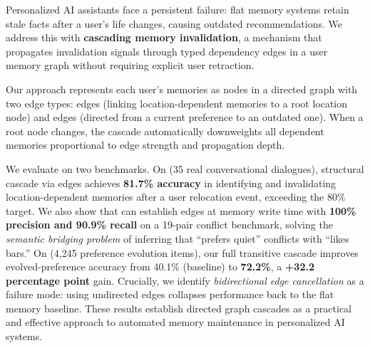 Personalized AI assistants face a persistent failure: flat memory systems retain stale facts after a user's life changes, causing outdated recommendations. We address this with \textbf{cascading memory invalidation}, a mechanism that propagates invalidation signals through typed dependency edges in a user memory graph without requiring explicit user retraction.

Our approach represents each user's memories as nodes in a directed graph with two edge types: \locatedin edges (linking location-dependent memories to a root location node) and \conflictswith edges (directed from a current preference to an outdated one). When a root node changes, the cascade automatically downweights all dependent memories proportional to edge strength and propagation depth.

We evaluate on two benchmarks. On \locomo (35 real conversational dialogues), structural cascade via \locatedin edges achieves \textbf{81.7\% accuracy} in identifying and invalidating location-dependent memories after a user relocation event, exceeding the 80\% target. We also show that \gptfouromini can establish \conflictswith edges at memory write time with \textbf{100\% precision and 90.9\% recall} on a 19-pair conflict benchmark, solving the \textit{semantic bridging problem} of inferring that ``prefers quiet'' conflicts with ``likes bars.'' On \horizonbench (4,245 preference evolution items), our full transitive cascade improves evolved-preference accuracy from 40.1\% (\flatmemory baseline) to \textbf{72.2\%}, a \textbf{+32.2 percentage point} gain. Crucially, we identify \textit{bidirectional edge cancellation} as a failure mode: using undirected \conflictswith edges collapses performance back to the flat memory baseline. These results establish directed graph cascades as a practical and effective approach to automated memory maintenance in personalized AI systems.
